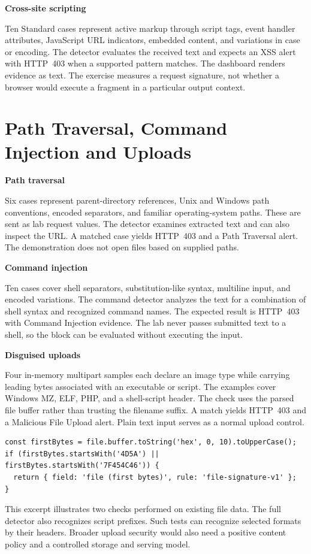 \documentclass[11pt,letterpaper,oneside]{report}
\newcommand{\topic}[1]{\smallskip\noindent\textbf{#1}\par\nobreak\vspace{-.39em}}
\newcommand{\sheet}[1]{\clearpage\section{#1}}
\begin{document}
\topic{Cross-site scripting}
Ten Standard cases represent active markup through script tags, event handler attributes, JavaScript URL indicators, embedded content, and variations in case or encoding. The detector evaluates the received text and expects an XSS alert with HTTP~403 when a supported pattern matches. The dashboard renders evidence as text. The exercise measures a request signature, not whether a browser would execute a fragment in a particular output context.

\sheet{Path Traversal, Command Injection and Uploads}
\topic{Path traversal}
Six cases represent parent-directory references, Unix and Windows path conventions, encoded separators, and familiar operating-system paths. These are sent as lab request values. The detector examines extracted text and can also inspect the URL. A matched case yields HTTP~403 and a Path Traversal alert. The demonstration does not open files based on supplied paths.

\topic{Command injection}
Ten cases cover shell separators, substitution-like syntax, multiline input, and encoded variations. The command detector analyzes the text for a combination of shell syntax and recognized command names. The expected result is HTTP~403 with Command Injection evidence. The lab never passes submitted text to a shell, so the block can be evaluated without executing the input.

\topic{Disguised uploads}
Four in-memory multipart samples each declare an image type while carrying leading bytes associated with an executable or script. The examples cover Windows MZ, ELF, PHP, and a shell-script header. The check uses the parsed file buffer rather than trusting the filename suffix. A match yields HTTP~403 and a Malicious File Upload alert. Plain text input serves as a normal upload control.

\begin{lstlisting}[caption={Illustrative leading-byte gate based on the upload detector}]
const firstBytes = file.buffer.toString('hex', 0, 10).toUpperCase();
if (firstBytes.startsWith('4D5A') || firstBytes.startsWith('7F454C46')) {
  return { field: 'file (first bytes)', rule: 'file-signature-v1' };
}
\end{lstlisting}

This excerpt illustrates two checks performed on existing file data. The full detector also recognizes script prefixes. Such tests can recognize selected formats by their headers. Broader upload security would also need a positive content policy and a controlled storage and serving model.
\end{document}
